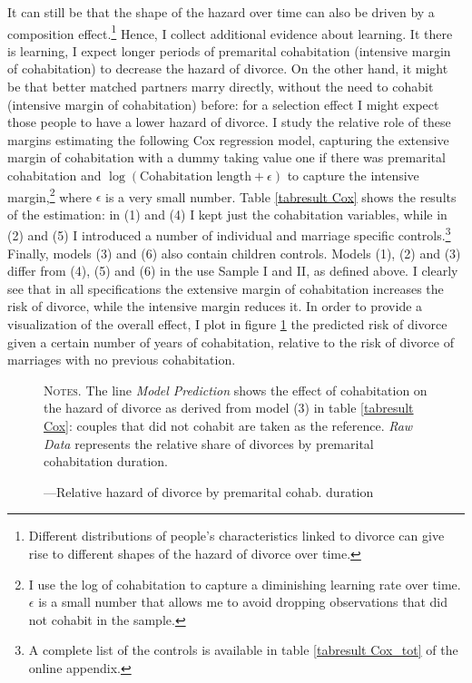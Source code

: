 \documentclass[12pt]{article}
\begin{document}
 It can still be that the shape of the hazard over time can also be driven by a composition effect.\footnote{Different distributions of people's characteristics linked to divorce can give rise to different shapes of the hazard of divorce over time.} Hence, I collect additional evidence about learning. It there is learning, I expect longer periods of premarital cohabitation (intensive margin of cohabitation) to decrease the hazard of divorce. On the other hand, it might be that better matched partners marry directly, without the need to cohabit (intensive margin of cohabitation) before: for a selection effect I might expect those people to have a lower hazard of divorce. I study the relative role of these margins estimating the following Cox regression model, capturing the extensive margin of cohabitation with a dummy taking value one if there was premarital cohabitation and $\log(\text{Cohabitation length}+\epsilon)$ to capture the intensive margin,\footnote{I use the log of cohabitation to capture a diminishing learning rate over time. $\epsilon$ is a small number that allows me to avoid dropping observations that did not cohabit in the sample.} where $\epsilon$ is a very small number. Table \ref{tabresult Cox} shows the results of the estimation: in (1) and (4) I kept just the cohabitation variables, while in (2) and (5) I introduced a number of individual and marriage specific controls.\footnote{A complete list of the controls is available in table \ref{tabresult Cox_tot} of the online appendix.} Finally, models (3) and (6) also contain children controls. Models (1), (2) and (3) differ from (4), (5) and (6) in the use Sample I and II, as defined above. I clearly see that in all specifications the extensive margin of cohabitation increases the risk of divorce, while the intensive margin reduces it. In order to provide a visualization of the overall effect, I plot in figure \ref{fig:cohabitationeffect} the predicted risk of divorce given a certain number of years of cohabitation, relative to the risk of divorce of marriages with no previous cohabitation.
\begin{figure}[h!]
	\centering
	\caption{---Relative hazard of divorce by premarital cohab. duration}
	\label{fig:cohabitationeffect}
	\hspace*{-1.1cm} 
	\resizebox{0.9\textwidth}{!}{}
	\begin{minipage}{0.99\textwidth} %
		
		\hspace{30em}
		
		{\scriptsize \textsc{Notes.}  The line \textit{Model Prediction} shows the effect of cohabitation on the hazard of divorce as derived from model (3) in table \ref{tabresult Cox}: couples that did not cohabit are taken as the reference. \textit{Raw Data} represents the relative share of divorces by premarital cohabitation duration.\par}
	\end{minipage}
\end{figure}
\end{document}
